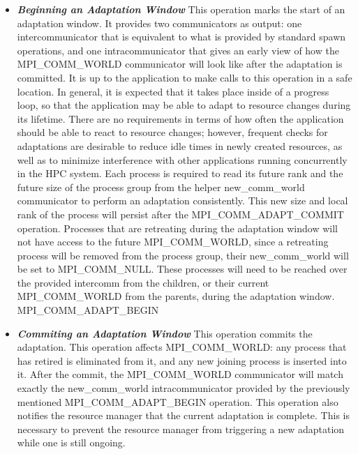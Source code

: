 \begin{itemize}
\item \textbf{\textit{Beginning an Adaptation Window}} This operation marks the start of an adaptation window. It provides two communicators as output: one intercommunicator that is equivalent to what is provided by standard spawn operations, and one intracommunicator that gives an early view of how the MPI{\_}COMM{\_}WORLD communicator will look like after the adaptation is committed. It is up to the application to make calls to this operation in a safe location. In general, it is expected that it takes place inside of a progress loop, so that the application may be able to adapt to resource changes during its lifetime. There are no requirements in terms of how often the application should be able to react to resource changes; however, frequent checks for adaptations are desirable to reduce idle times in newly created resources, as well as to minimize interference with other applications running concurrently in the HPC system. Each process is required to read its future rank and the future  size of the process group from the helper new{\_}comm{\_}world communicator to perform an adaptation consistently. This new size and local rank of the process will persist after the MPI{\_}COMM{\_}ADAPT{\_}COMMIT operation. Processes that are retreating during the adaptation window will not have access to the future MPI{\_}COMM{\_}WORLD, since a retreating process will be removed from the process group, their new{\_}comm{\_}world will be set to MPI{\_}COMM{\_}NULL. These processes will need to be reached over the provided intercomm from the children, or their current MPI{\_}COMM{\_}WORLD from the parents, during the adaptation window. MPI{\_}COMM{\_}ADAPT{\_}BEGIN
\item \textbf{\textit{Commiting an Adaptation Window}} This operation commits the adaptation. This operation affects MPI{\_}COMM{\_}WORLD: any process that has retired is eliminated from it, and any new joining process is inserted into it. After the commit, the MPI{\_}COMM{\_}WORLD communicator will match exactly the new{\_}comm{\_}world intracommunicator provided by the previously mentioned MPI{\_}COMM{\_}ADAPT{\_}BEGIN operation. This operation also notifies the resource manager that the current adaptation is complete. This is necessary to prevent the resource manager from triggering a new adaptation while one is still ongoing.
\end{itemize}

